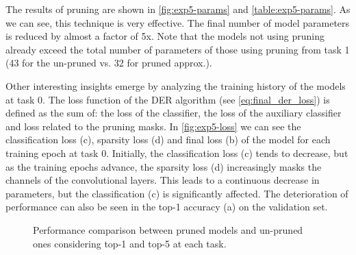 The results of pruning are shown in \autoref{fig:exp5-params} and \autoref{table:exp5-params}.
As we can see, this technique is very effective.
The final number of model parameters is reduced by almost a factor of 5x.
Note that the models not using pruning already exceed the total number of parameters of those using pruning from task 1 (43 for the un-pruned vs. 32 for pruned approx.).

Other interesting insights emerge by analyzing the training history of the models at task 0.
The loss function of the DER algorithm (see \autoref{eq:final_der_loss}) is defined as the sum of: the loss of the classifier, the loss of the auxiliary classifier and loss related to the pruning masks.
In \autoref{fig:exp5-loss} we can see the classification loss (c), sparsity loss (d) and final loss (b) of the model for each training epoch at task 0.
Initially, the classification loss (c) tends to decrease, but as the training epochs advance, the sparsity loss (d) increasingly masks the channels of the convolutional layers.
This leads to a continuous decrease in parameters, but the classification (c) is significantly affected.
The deterioration of performance can also be seen in the top-1 accuracy (a) on the validation set.

\begin{figure}[H]
	\centering
	\caption{Performance comparison between pruned models and un-pruned ones considering top-1 and top-5 at each task.}%
	\label{fig:exp5}%
\end{figure}


